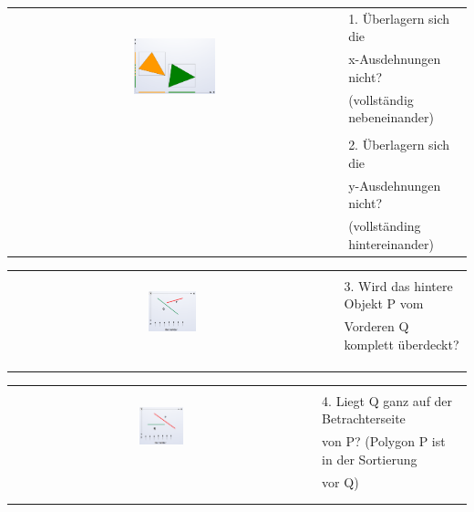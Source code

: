 \begin{tabular}{cl}
  \multirow{3}{*}{
    \includegraphics[width=0.25\textwidth]{assets/paintersalg-overlapping.png}
  } & 1. Überlagern sich die \\
  & x-Ausdehnungen nicht? \\
  & (vollständig nebeneinander) \\
  & \\
  & 2. Überlagern sich die \\
  & y-Ausdehnungen nicht? \\
  & (vollständing hintereinander)\\
\end{tabular}

\begin{tabular}{cl}
  \multirow{3}{*}{
    \includegraphics[width=0.15\textwidth]{assets/paintersalg-backside.png}
  } & \\
  & 3. Wird das hintere Objekt P vom \\
  & Vorderen Q komplett überdeckt? \\
  & \\
  & \\
  & \\
\end{tabular}

\begin{tabular}{cl}
  \multirow{3}{*}{
    \includegraphics[width=0.15\textwidth]{assets/paintersalg-frontside.png}
  } & \\
  & 4. Liegt Q ganz auf der Betrachterseite  \\
  & von P? (Polygon P ist in der Sortierung \\
  & vor Q) \\
  & \\
  & \\
\end{tabular}

